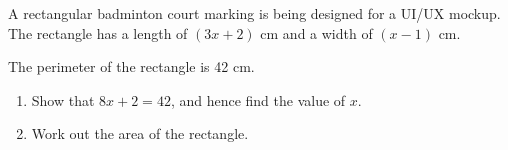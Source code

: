 \begin{question}
\noindent A rectangular badminton court marking is being designed for a UI/UX mockup. The rectangle has a length of $(3x + 2)$ cm and a width of $(x - 1)$ cm.

\begin{center}
\end{center}

\noindent The perimeter of the rectangle is 42 cm.

\begin{enumerate}
    \item[(a)] Show that $8x + 2 = 42$, and hence find the value of $x$.
    \vspace{4cm}

    \item[(b)] Work out the area of the rectangle.
    \vspace{3cm}
\end{enumerate}
\end{question}
